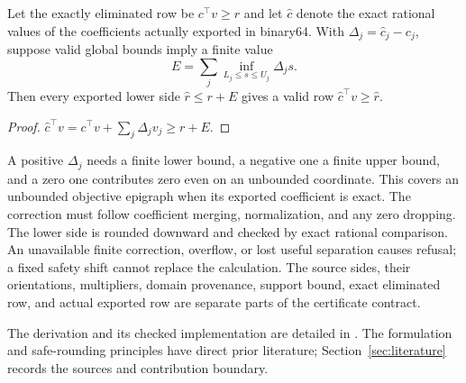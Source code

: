 \begin{proposition}\label{prop:elimination-round}
Let the exactly eliminated row be $c^\top v\ge r$ and let
$\widehat c$ denote the exact rational values of the coefficients
actually exported in binary64. With $\Delta_j=\widehat c_j-c_j$, suppose
valid global bounds imply a finite value
\[
E=\sum_j\inf_{L_j\le s\le U_j}\Delta_j s.
\]
Then every exported lower side $\widehat r\le r+E$ gives a valid row
$\widehat c^\top v\ge\widehat r$.
\end{proposition}
\begin{proof}
$\widehat c^\top v=c^\top v+\sum_j\Delta_jv_j\ge r+E$.
\end{proof}

A positive $\Delta_j$ needs a finite lower bound, a negative one a
finite upper bound, and a zero one contributes zero even on an unbounded
coordinate. This covers an unbounded objective epigraph when its exported
coefficient is exact. The correction must follow coefficient merging,
normalization, and any zero dropping. The lower side is rounded downward
and checked by exact rational comparison. An unavailable finite correction,
overflow, or lost useful separation causes refusal; a fixed safety shift
cannot replace the calculation. The source sides, their orientations,
multipliers, domain provenance, support bound, exact eliminated row, and
actual exported row are separate parts of the certificate contract.

The derivation and its checked implementation are detailed in
.
The formulation and safe-rounding principles have direct prior literature;
Section~\ref{sec:literature} records the sources and contribution boundary.
